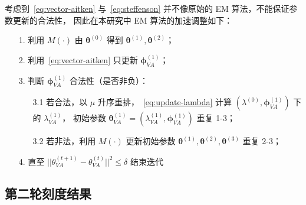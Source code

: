考虑到~\eqref{eq:vector-aitken} 与~\eqref{eq:steffenson} 并不像原始的 EM 算法，不能保证参数更新的合法性，
因此在本研究中 EM 算法的加速调整如下：
\begin{enumerate}
    \item[1.] 利用 $M(\cdot)$ 由 $\boldsymbol{\theta}^{(0)}$ 得到 $\boldsymbol{\theta}^{(1)}, \boldsymbol{\theta}^{(2)}$；
    \item[2.] 利用~\eqref{eq:vector-aitken} 只更新 $\boldsymbol{\phi}_{VA}^{(1)}$；
    \item[3.] 判断 $\boldsymbol{\phi}_{VA}^{(1)}$ 合法性（是否非负）：
    \begin{enumerate}
        \item[3.1 ] 若合法，以 $\mu$ 升序重排，~\eqref{eq:update-lambda} 计算 $(\lambda^{(0)}, \boldsymbol{\phi}_{VA}^{(1)})$ 下的 $\lambda_{VA}^{(1)}$，
        初始参数 $\boldsymbol{\theta}_{VA}^{(1)}=(\lambda_{VA}^{(1)}, \boldsymbol{\phi}_{VA}^{(1)})$ 重复 1-3；
        \item[3.2 ] 若非法，利用 $M(\cdot)$ 更新初始参数 $\boldsymbol{\theta}^{(1)},\boldsymbol{\theta}^{(2)}, \boldsymbol{\theta}^{(3)}$ 重复 2-3；
    \end{enumerate}
    \item[4.] 直至 $||\theta_{VA}^{(t+1)}-\theta_{VA}^{(t)}||^2\leq\delta$ 结束迭代
\end{enumerate}

\subsection{第二轮刻度结果}
